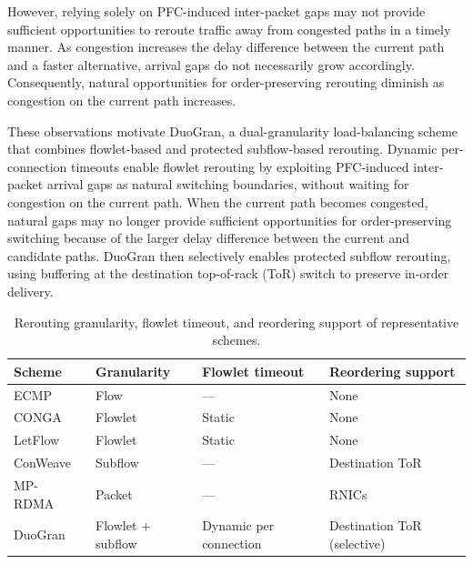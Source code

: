 \documentclass[10pt,journal,compsoc]{IEEEtran}
\begin{document}
However, relying solely on PFC-induced inter-packet gaps may not provide sufficient opportunities to reroute traffic away from congested paths in a timely manner. As congestion increases the delay difference between the current path and a faster alternative, arrival gaps do not necessarily grow accordingly. Consequently, natural opportunities for order-preserving rerouting diminish as congestion on the current path increases.

These observations motivate DuoGran, a dual-granularity load-balancing scheme that combines flowlet-based and protected subflow-based rerouting. Dynamic per-connection timeouts enable flowlet rerouting by exploiting PFC-induced inter-packet arrival gaps as natural switching boundaries, without waiting for congestion on the current path. When the current path becomes congested, natural gaps may no longer provide sufficient opportunities for order-preserving switching because of the larger delay difference between the current and candidate paths. DuoGran then selectively enables protected subflow rerouting, using buffering at the destination top-of-rack (ToR) switch to preserve in-order delivery.



\begin{table}[t]
    \centering
    \caption{Rerouting granularity, flowlet timeout, and reordering support of representative schemes.}
    \label{tab:lb_comparison}
    \footnotesize
    \setlength{\tabcolsep}{3pt}
    \renewcommand{\arraystretch}{1.15}
    \begin{tabularx}{\columnwidth}{@{}l>{\raggedright\arraybackslash}p{}>{\raggedright\arraybackslash}p{}>{\raggedright\arraybackslash}X@{}}
        \toprule
        \textbf{Scheme} & \textbf{Granularity} & \textbf{Flowlet timeout} & \textbf{Reordering support} \\
        \midrule
        ECMP~\cite{ECMP} & Flow & --- & None \\
        CONGA~\cite{Conga} & Flowlet & Static & None \\
        LetFlow~\cite{Letflow} & Flowlet & Static & None \\
        ConWeave~\cite{Conweave} & Subflow & --- & Destination ToR \\
        MP-RDMA~\cite{MPRDMA} & Packet & --- & RNICs \\
        DuoGran & Flowlet + subflow & Dynamic per connection & Destination ToR (selective) \\
        \bottomrule
    \end{tabularx}
\end{table}
\end{document}
